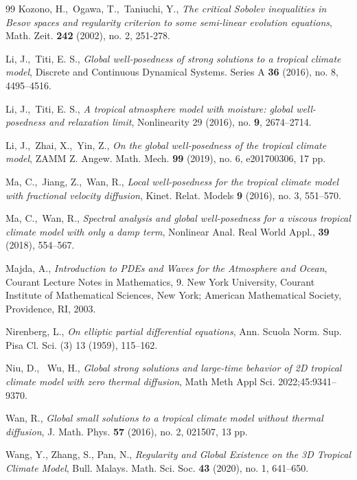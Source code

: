 \documentclass[a4paper]{article}
\begin{document}
\begin{thebibliography}{99}
 Kozono, H.,\ Ogawa, T.,\ Taniuchi, Y., \emph{The
    critical Sobolev inequalities in Besov spaces and regularity
    criterion to some semi-linear evolution equations}, {Math. Zeit.}
  \textbf{242} (2002), no. 2, 251-278.

 Li, J.,\ Titi, E. S., \emph{Global well-posedness of
    strong solutions to a tropical climate model}, {Discrete and
    Continuous Dynamical Systems. Series A} \textbf{36} (2016),
  no. {8}, {4495--4516}.
  
 Li, J.,\ Titi, E. S., \emph{A tropical atmosphere
    model with moisture: global well-posedness and relaxation limit},
  Nonlinearity 29 (2016), no. \textbf{9}, 2674--2714. 
  
 Li, J.,\ Zhai, X.,\ Yin, Z., \emph{On the global
    well-posedness of the tropical climate model}, ZAMM
  Z. Angew. Math. Mech. \textbf{99} (2019), no. 6, e201700306, 17 pp.

 Ma, C.,\ Jiang, Z.,\ Wan, R., \emph{Local
    well-posedness for the tropical climate model with fractional
    velocity diffusion}, Kinet.  Relat. Models \textbf{9} (2016),
  no. 3, 551--570.

 Ma, C.,\ Wan, R., \emph{Spectral analysis and global
    well-posedness for a viscous tropical climate model with only a
    damp term}, {Nonlinear Anal. Real World Appl.}, \textbf{39}
  (2018), 554--567.
 
 Majda, A., \emph{Introduction to PDEs and Waves for the
    Atmosphere and Ocean}, Courant Lecture Notes in Mathematics,
  9. New York University, Courant Institute of Mathematical Sciences,
  New York; American Mathematical Society, Providence, RI, 2003.
 
 Nirenberg, L.,  \emph{On elliptic partial
    differential equations}, Ann. Scuola Norm. Sup. Pisa Cl. Sci. (3)
  13 (1959), 115–162.
  
     Niu, D., \ Wu, H., \emph{Global strong solutions and large-time
behavior of 2D tropical climate model with zero thermal diffusion},
Math Meth Appl Sci. 2022;45:9341–9370.

 Wan, R., \emph{Global small solutions to a tropical
    climate model without thermal diffusion}, {J. Math. Phys.}
  \textbf{57} (2016), no. {2}, {021507, 13 pp.}
  
 Wang, Y., Zhang, S., Pan, N.,
  \emph{Regularity and Global Existence on the 3D Tropical Climate
    Model}, Bull. Malays. Math. Sci. Soc. \textbf{43} (2020), no. 1,
  641--650.
  

\end{thebibliography}
\end{document}
